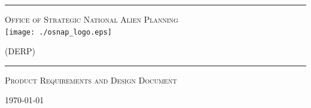 \begin{titlepage}
\begin{center}

\rule{\linewidth}{0.5mm}

\textsc{\large Office of Strategic National Alien Planning}
~\\[1cm]
\texttt{[image: ./osnap\_logo.eps]}~\\[1cm]

{\Huge \linespread{2}}

\vspace{10pt}

\textsc{\Large (DERP)}

\rule{\linewidth}{0.5mm}

\vfill

\textsc{\Large Product Requirements and Design Document}


\vfill
{\large \today}

\end{center}
\end{titlepage}